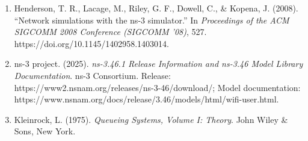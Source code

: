 \documentclass[
]{article}
\begin{document}
\begin{enumerate}
\item
  Henderson, T. R., Lacage, M., Riley, G. F., Dowell, C., \& Kopena, J.
  (2008). ``Network simulations with the ns-3 simulator.'' In
  \emph{Proceedings of the ACM SIGCOMM 2008 Conference (SIGCOMM '08)},
  527. https://doi.org/10.1145/1402958.1403014.
\item
  ns-3 project. (2025). \emph{ns-3.46.1 Release Information and ns-3.46
  Model Library Documentation}. ns-3 Consortium. Release:
  https://www2.nsnam.org/releases/ns-3-46/download/; Model
  documentation:
  https://www.nsnam.org/docs/release/3.46/models/html/wifi-user.html.
\item
  Kleinrock, L. (1975). \emph{Queueing Systems, Volume I: Theory}. John
  Wiley \& Sons, New York.
\end{enumerate}
\end{document}
